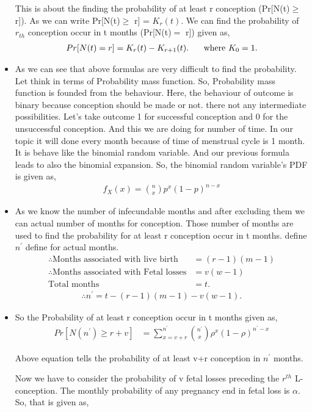 \documentclass{article}
\begin{document}
\begin{itemize}
\par This is about the finding the probability of at least r conception (Pr[N(t)$\ge$ r]). As we can write Pr[N(t)$\ge$ r] = $K_r(t)$. We can find the probability of $r_{th}$ conception occur in t months (Pr[N(t)$ = $ r]) given as,
\begin{align*}
    Pr[N(t) =  r] =  K_r(t) - K_{r+1}(t) . \hspace{5 mm} \text{ where } K_0 = 1.
\end{align*}
\item As we can see that above formulas are very difficult to find the probability. Let think in terms of Probability mass function. So, Probability mass function is founded from the behaviour. Here, the behaviour of outcome is binary because conception should be made or not. there not any intermediate possibilities. Let's take outcome 1 for successful conception and 0 for the unsuccessful conception. And this we are doing for number of time. In our topic it will done every month because of time of menstrual cycle is 1 month. It is behave like the binomial random variable. And our previous formula leads to also the binomial expansion. So, the binomial random variable's PDF is given as,
\begin{align*}
    f_X(x) = \binom{n}{x} p^x (1 - p)^{n - x}
\end{align*}
\item As we know the number of infecundable months and after excluding them we can actual number of months for conception. Those number of months are used to find the probability for at least r conception occur in t months. define $n^{'}$ define for actual months.
\begin{align*}
    \therefore \text{Months associated with live birth} &= (r-1)(m-1)
    \\
    \therefore \text{Months associated with Fetal losses} &= v(w-1)
    \\
    \text{Total months} &= t. 
\end{align*}
\begin{align*}
    \therefore n^{'} = t - (r-1)(m-1) - v(w-1).
\end{align*}
\item So the Probability of at least r conception occur in t months given as,
\begin{align*}
    Pr[N(n^{'})\ge r+v] &= \sum_{x = v+r}^{n^{'}} \binom{n^{'}}{x} \rho^x (1 - \rho)^{n^{'}-x} 
\end{align*}
\par Above equation tells the probability of at least v+r conception in $n^{'}$ months. \par Now we have to consider the probability of v fetal losses preceding the $r^{th}$ L-conception. The monthly probability of any pregnancy end in fetal loss is $\alpha$. So, that is given as,

\end{itemize}
\end{document}
